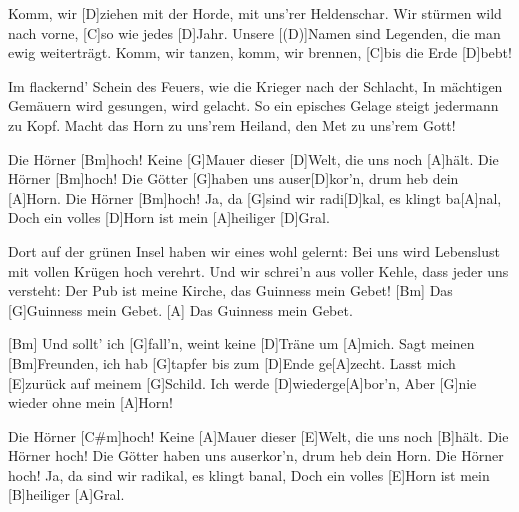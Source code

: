 

\begin{guitar}
	Komm, wir [D]ziehen mit der Horde, mit uns'rer Heldenschar.
	Wir stürmen wild nach vorne, [C]so wie jedes [D]Jahr.
	Unsere [(D)]Namen sind Legenden, die man ewig weiterträgt.
	Komm, wir tanzen, komm, wir brennen, [C]bis die Erde [D]bebt!
	
	Im flackernd' Schein des Feuers, wie die Krieger nach der Schlacht,
	In mächtigen Gemäuern wird gesungen, wird gelacht.
	So ein episches Gelage steigt jedermann zu Kopf.
	Macht das Horn zu uns'rem Heiland, den Met zu uns'rem Gott!
	
	Die Hörner [Bm]hoch! Keine [G]Mauer dieser [D]Welt, die uns noch [A]hält.
	Die Hörner [Bm]hoch! Die Götter [G]haben uns auser[D]kor'n, drum heb dein [A]Horn.
	Die Hörner [Bm]hoch! Ja, da [G]sind wir radi[D]kal, es klingt ba[A]nal,
	Doch ein volles [D]Horn ist mein [A]heiliger [D]Gral.
	
	Dort auf der grünen Insel haben wir eines wohl gelernt:
	Bei uns wird Lebenslust mit vollen Krügen hoch verehrt.
	Und wir schrei'n aus voller Kehle, dass jeder uns versteht:
	Der Pub ist meine Kirche, das Guinness mein Gebet!
	[Bm] Das [G]Guinness mein Gebet.
	[A] Das Guinness mein Gebet.
	
	 
	
	[Bm] Und sollt' ich [G]fall'n, weint keine [D]Träne um [A]mich.
	Sagt meinen [Bm]Freunden, ich hab [G]tapfer bis zum [D]Ende ge[A]zecht.
	Lasst mich [E]zurück auf meinem [G]Schild.
	Ich werde [D]wiederge[A]bor'n,
	Aber [G]nie wieder ohne mein [A]Horn!
	
	Die Hörner [C#m]hoch!
	Keine [A]Mauer dieser [E]Welt, die uns noch [B]hält.
	Die Hörner hoch!
	Die Götter haben uns auserkor'n, drum heb dein Horn.
	Die Hörner hoch!
	Ja, da sind wir radikal, es klingt banal,
	Doch ein volles [E]Horn ist mein [B]heiliger [A]Gral.
\end{guitar}